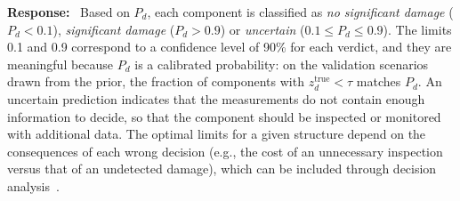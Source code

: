 \documentclass[11pt]{article}
\newenvironment{response}{\par\smallskip\noindent\color{resp}\textbf{Response:}\ }{\par}
\begin{document}
\begin{response}
Based on $P_d$, each component is classified as \emph{no significant damage} ($P_d<0.1$), \emph{significant damage} ($P_d>0.9$) or \emph{uncertain} ($0.1\le P_d\le0.9$).
The limits 0.1 and 0.9 correspond to a confidence level of 90\% for each verdict, and they are meaningful because $P_d$ is a calibrated probability: on the validation scenarios drawn from the prior, the fraction of components with $z_d^{\text{true}}<\tau$ matches $P_d$.
An uncertain prediction indicates that the measurements do not contain enough information to decide, so that the component should be inspected or monitored with additional data.
The optimal limits for a given structure depend on the consequences of each wrong decision (e.g., the cost of an unnecessary inspection versus that of an undetected damage), which can be included through decision analysis~\cite{kamariotis2022value}.


\end{response}
\end{document}
